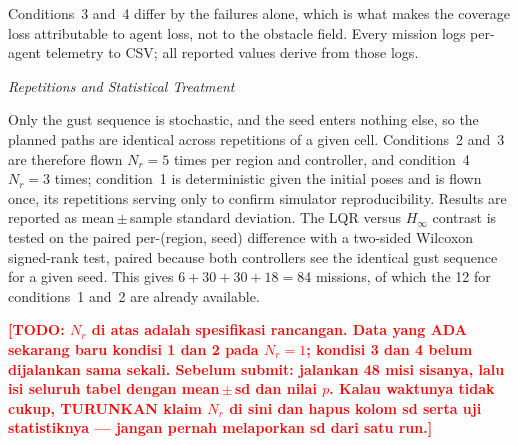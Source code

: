 \documentclass[10pt,letterpaper]{article}
\newcommand{\headingthree}[1]{%
    \par\vspace{6pt}%
    {\centering\fontsize{10}{12}\selectfont\itshape #1\par}%
    \vspace{2pt}\noindent\ignorespaces}
\newcommand{\TODO}[1]{\textcolor{red}{\textbf{[TODO: #1]}}}
\begin{document}
Conditions~3 and~4 differ by the failures alone, which is what makes the coverage loss
attributable to agent loss, not to the obstacle field. Every mission logs per-agent
telemetry to CSV; all reported values derive from those logs.

\headingthree{Repetitions and Statistical Treatment}

Only the gust sequence is stochastic, and the seed enters nothing else, so the planned
paths are identical across repetitions of a given cell. Conditions~2 and~3 are therefore
flown $N_r=5$ times per region and controller, and condition~4 $N_r=3$ times; condition~1
is deterministic given the initial poses and is flown once, its repetitions serving only to
confirm simulator reproducibility. Results are reported as mean\,$\pm$\,sample standard
deviation. The LQR versus $H_\infty$ contrast is tested on the paired per-(region, seed)
difference with a two-sided Wilcoxon signed-rank test, paired because both controllers see
the identical gust sequence for a given seed. This gives $6+30+30+18=84$ missions, of which
the 12 for conditions~1 and~2 are already available.

\TODO{$N_r$ di atas adalah spesifikasi rancangan. Data yang ADA sekarang baru kondisi 1
    dan 2 pada $N_r=1$; kondisi 3 dan 4 belum dijalankan sama sekali. Sebelum submit:
    jalankan 48 misi sisanya, lalu isi seluruh tabel dengan mean\,$\pm$\,sd dan nilai $p$.
    Kalau waktunya tidak cukup, TURUNKAN klaim $N_r$ di sini dan hapus kolom sd serta uji
    statistiknya --- jangan pernah melaporkan sd dari satu run.}
\end{document}
